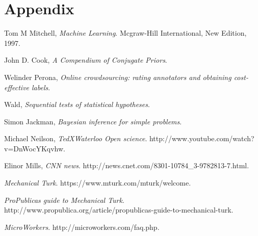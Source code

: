 \documentclass[11pt]{article}
\begin{document}
\section{Appendix}

\begin{thebibliography}{99}

  Tom M Mitchell,
  \emph{Machine Learning}.
  Mcgraw-Hill International,
  New Edition,
  1997.
  
  John D. Cook,
  \emph{A Compendium of Conjugate Priors}.

  Welinder Perona,
  \emph{Online crowdsourcing: rating annotators and obtaining cost-effective labels}.
  
  Wald,
  \emph{Sequential tests of statistical hypotheses}.
  
  Simon Jackman,
  \emph{Bayesian inference for simple problems}.
  
  Michael Neilson,
  \emph{TedXWaterloo Open science}.
  http://www.youtube.com/watch?v=DnWocYKqvhw.

	Elinor Mills,
	\emph{CNN news}.
	http://news.cnet.com/8301-10784\_3-9782813-7.html.   
	
	\emph{Mechanical Turk}.
	https://www.mturk.com/mturk/welcome.	
	
	
	\emph{ProPublicas guide to Mechanical Turk}.
	http://www.propublica.org/article/propublicas-guide-to-mechanical-turk.
	
	\emph{MicroWorkers}.
	http://microworkers.com/faq.php.
  

\end{thebibliography}
\end{document}

